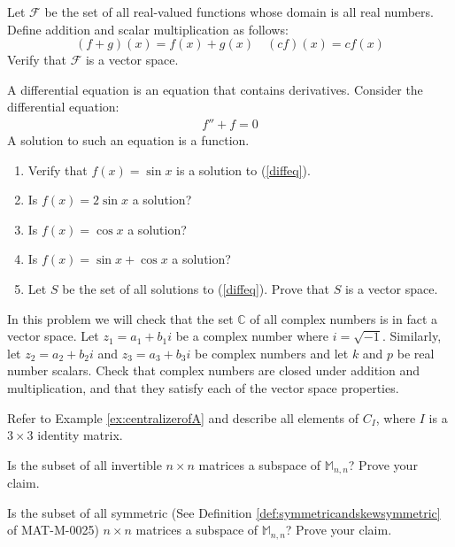 \documentclass{ximera}
\begin{document}
 \begin{problem}
 Let $\mathcal{F}$ be the set of all real-valued functions whose domain is all real numbers.  Define addition and scalar multiplication as follows:
 $$(f+g)(x)=f(x)+g(x)\quad (cf)(x)=cf(x)$$
 Verify that $\mathcal{F}$ is a vector space.
 \end{problem}
 \begin{problem}
 A differential equation is an equation that contains derivatives.  Consider the differential equation:
 \begin{align}\label{diffeq} f''+f=0\end{align}
A solution to such an equation is a function.
  \begin{enumerate}
  \item Verify that $f(x)=\sin x$ is a solution to (\ref{diffeq}).
  \item Is $f(x)=2\sin x$ a solution?
  \item Is $f(x)=\cos x$ a solution?
  \item Is $f(x)=\sin x+\cos x$ a solution?
  \item Let $S$ be the set of all solutions to (\ref{diffeq}).  Prove that $S$ is a vector space.
  \end{enumerate}
  \end{problem}
\begin{problem}
In this problem we will check that the set $\mathbb{C}$ of all complex numbers is in fact a vector space.  Let $z_1 = a_1 + b_1 i$ be a complex number where $i=\sqrt{-1}$.  Similarly, let $z_2 = a_2 + b_2 i$ and $z_3 = a_3 + b_3 i$ be complex numbers and let $k$ and $p$ be real number scalars.  Check that complex numbers are closed under addition and multiplication, and that they satisfy each of the vector space properties.
\end{problem}

\begin{problem}
Refer to Example \ref{ex:centralizerofA} and describe all elements of $C_I$, where $I$ is a $3\times 3$ identity matrix.
\end{problem}
  
\begin{problem}
Is the subset of all invertible $n\times n$ matrices a subspace of $\mathbb{M}_{n,n}$?  Prove your claim. 
\end{problem}

\begin{problem}\label{prob:symmetricsubspace}
Is the subset of all symmetric (See Definition \ref{def:symmetricandskewsymmetric} of MAT-M-0025) $n\times n$ matrices a subspace of $\mathbb{M}_{n,n}$?  Prove your claim. 
\end{problem}
\end{document}
